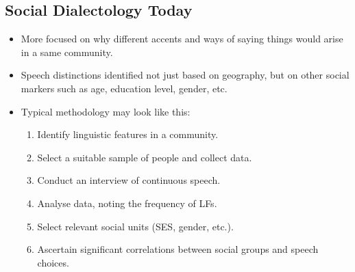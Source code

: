 \documentclass[../main.tex]{subfiles}
\begin{document}
        \subsection{Social Dialectology Today}
        \begin{itemize}
            \item More focused on why different accents and ways of saying things would arise in a same community.
            \item Speech distinctions identified not just based on geography, but on other social markers such as age, education level, gender, etc.
            \item Typical methodology may look like this: \begin{enumerate}
                \item Identify linguistic features in a community.
                \item Select a suitable sample of people and collect data.
                \item Conduct an interview of continuous speech.
                \item Analyse data, noting the frequency of LFs.
                \item Select relevant social units (SES, gender, etc.).
                \item Ascertain significant correlations between social groups and speech choices.
            \end{enumerate}
        \end{itemize}

        
\end{document}
